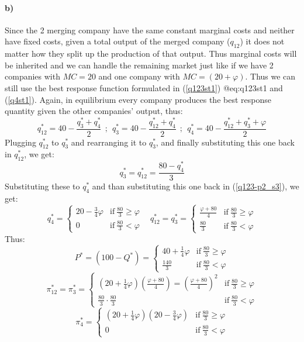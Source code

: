 \documentclass[10pt,a4paper]{article}
\begin{document}
\paragraph*{b)} Since the 2 merging company have the same constant marginal costs and neither have fixed costs, given a total output of the merged company ($q_{12}$) it does not matter how they split up the production of that output. Thus marginal costs will be inherited and we can handle the remaining market just like if we have 2 companies with $MC=20$ and one company with $MC=(20+\varphi)$. Thus we can still use the best response function formulated in (\ref{q123st1}) @eq:q123st1 and (\ref{q4st1}). Again, in equilibrium every company produces the best response quantity given the other companies' output, thus:
\begin{equation}
	q_{12}^* = 40 - \frac{q_3^*+q_4^*}{2} ~~;~~ q_{3}^* = 40 - \frac{q_{12}^*+q_4^*}{2} ~~;~~ q_{4}^* = 40 - \frac{q_{12}^*+q_3^*+\varphi}{2}
\end{equation}
Plugging $q_{12}^*$ to $q_3^*$ and rearranging it to $q_3^*$, and finally substituting this one back in $q_{12}^*$, we get:
\begin{equation}
	\label{q123-p2_s3}
	q_3^*=q_{12}^*=\frac{80-q_4^*}{3}
\end{equation}
Substituting these to $q_4^*$ and than substituting this one back in (\ref{q123-p2_s3}), we get:
\begin{equation}
	q_4^*=
	\begin{cases}
		20-\frac34\varphi & \text{if}~\frac{80}{3}\geq \varphi \\
		0 & \text{if}~\frac{80}{3}<\varphi
	\end{cases}
	~~~~
	q_{12}^*=q_3^*=
	\begin{cases}
		\frac{\varphi+80}{4} & \text{if}~\frac{80}{3}\geq \varphi \\
		\frac{80}{3} & \text{if}~\frac{80}{3}<\varphi
	\end{cases}
\end{equation}
Thus:
\begin{equation}
	P^*= (100-Q^*) =
	\begin{cases}
		40+\frac14 \varphi & \text{if}~\frac{80}{3}\geq \varphi \\
		\frac{140}3 & \text{if}~\frac{80}{3}<\varphi
	\end{cases}
\end{equation}
\begin{equation}
	\pi_{12}^*=\pi_3^*=
	\begin{cases}
		\left( 20+\frac14\varphi \right) \left( \frac{\varphi+80}{4} \right) = \left( \frac{\varphi+80}{4}\right)^2& \text{if}~\frac{80}{3}\geq \varphi \\
		\frac{80}3 \cdot \frac{80}3 & \text{if}~\frac{80}{3}<\varphi
	\end{cases}
\end{equation}
\begin{equation}
	\label{pi4qb}
	\pi_{4}^*=
	\begin{cases}
		\left( 20+\frac14\varphi \right) \left( 20-\frac34 \varphi \right) & \text{if}~\frac{80}{3}\geq \varphi \\
		0 & \text{if}~\frac{80}{3}<\varphi
	\end{cases}
\end{equation}
\end{document}

